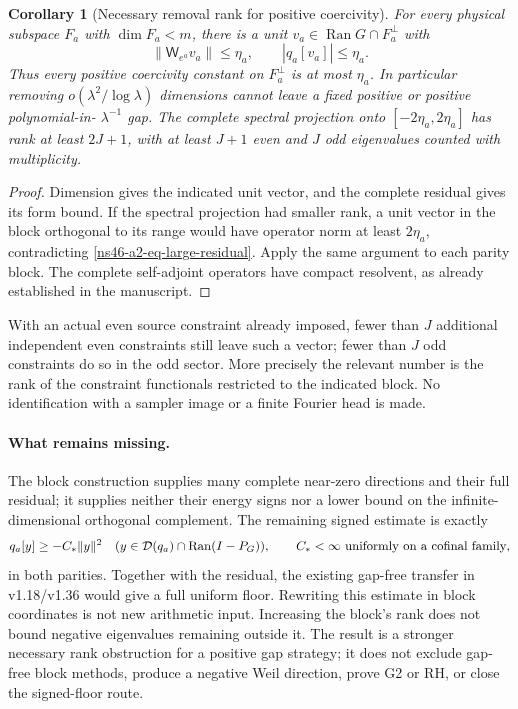 \documentclass[11pt]{article}
\newtheorem{corollary}[theorem]{Corollary}
\theoremstyle{remark}
\begin{document}
\begin{corollary}[Necessary removal rank for positive coercivity]
\label{ns46-a2-cor-rank}
For every physical subspace $F_a$ with $\dim F_a<m$, there is a
unit $v_a\in\operatorname{Ran}G\cap F_a^\perp$ with
\[
 \|\mathsf W_{e^a}v_a\|\le\eta_a,
 \qquad |q_a[v_a]|\le\eta_a.
\]
Thus every positive coercivity constant on $F_a^\perp$ is at most
$\eta_a$. In particular removing $o(\lambda^2/\log\lambda)$
dimensions cannot leave a fixed positive or positive polynomial-in-
$\lambda^{-1}$ gap. The complete spectral projection onto
$[-2\eta_a,2\eta_a]$ has rank at least $2J+1$, with at least
$J+1$ even and $J$ odd eigenvalues counted with multiplicity.
\end{corollary}
\begin{proof}
Dimension gives the indicated unit vector, and the complete residual
gives its form bound. If the spectral projection had smaller rank,
a unit vector in the block orthogonal to its range would have
operator norm at least $2\eta_a$, contradicting
\eqref{ns46-a2-eq-large-residual}. Apply the same argument to each
parity block. The complete self-adjoint operators have compact
resolvent, as already established in the manuscript.
\end{proof}
With an actual even source constraint already imposed, fewer than
$J$ additional independent even constraints still leave such a vector;
fewer than $J$ odd constraints do so in the odd sector. More precisely
the relevant number is the rank of the constraint functionals restricted
to the indicated block. No identification with a sampler image or a
finite Fourier head is made.

\paragraph{What remains missing.}
The block construction supplies many complete near-zero directions and
their full residual; it supplies neither their energy signs nor a lower
bound on the infinite-dimensional orthogonal complement. The remaining
signed estimate is exactly
\[
 q_a[y]\ge-C_*\|y\|^2\quad
 (y\in\mathcal D(q_a)\cap\operatorname{Ran}(I-P_G)),
 \qquad C_*<\infty\ \hbox{uniformly on a cofinal family},
\]
in both parities. Together with the residual, the existing gap-free
transfer in v1.18/v1.36 would give a full uniform floor. Rewriting this
estimate in block coordinates is not new arithmetic input. Increasing
the block's rank does not bound negative eigenvalues remaining outside
it. The result is a stronger necessary rank obstruction for a positive
gap strategy; it does not exclude gap-free block methods, produce a
negative Weil direction, prove G2 or RH, or close the signed-floor route.
\end{document}
